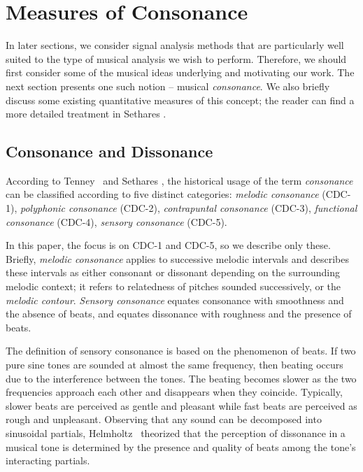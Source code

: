 \section{Measures of Consonance}
In later sections, we consider signal analysis methods that are
particularly well suited to the type of musical analysis we wish to
perform.  Therefore, we should first consider %
some of the musical ideas underlying and motivating our work.
The next section presents one such notion --
musical \emph{consonance}.  We also briefly discuss some existing
quantitative measures of this concept; the reader can find a more detailed
treatment in Sethares \citeyear{Sethares:1997}.

\subsection{Consonance and Dissonance}
\label{sec:consonance}
According to Tenney~\citeyear{Tenney:1988} and Sethares
\citeyear{Sethares:1997}, the historical usage of the term {\it
consonance} 
can be classified according to five distinct categories:
\emph{melodic consonance} (CDC-1), \emph{polyphonic consonance} (CDC-2),
\emph{contrapuntal consonance} (CDC-3), \emph{functional consonance} (CDC-4),
\emph{sensory consonance} (CDC-5).  

In this paper, the focus is on CDC-1 and CDC-5, so we describe only these.
Briefly, \emph{melodic consonance} applies to successive melodic intervals and
describes these intervals as either consonant or dissonant depending on the
surrounding melodic context; it refers to relatedness of pitches sounded
successively, or the \emph{melodic contour}.  \emph{Sensory consonance}
equates consonance with smoothness and the absence of beats, and equates
dissonance with roughness and the presence of beats.

The definition of sensory consonance is based on the  phenomenon of
beats.  If two pure sine tones are sounded at almost the same
frequency, then beating occurs due to the interference between the
tones.  The beating becomes slower as the two frequencies approach
each other and disappears when they coincide.  Typically, slower  
beats are perceived as gentle and pleasant while fast beats are
perceived as rough and unpleasant. Observing that any sound can be
decomposed into sinusoidal partials, Helmholtz~\citeyear{Helmholtz:1877}
theorized that the perception of dissonance in a musical tone is
determined by the presence and quality of beats among the tone's
interacting partials. 

